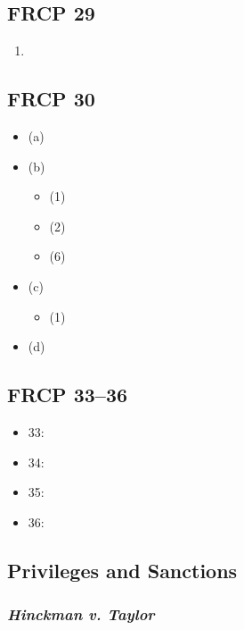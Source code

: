 \subsection{FRCP 29}

\begin{enumerate}
    \item %
\end{enumerate}

\subsection{FRCP 30}

\begin{itemize}
    \item (a) %
    \item (b) %
    \begin{itemize}
        \item (1) %
        \item (2) %
        \item (6) %
    \end{itemize}
    \item (c) %
    \begin{itemize}
        \item (1) %
    \end{itemize}
    \item (d) %
\end{itemize}

\subsection{FRCP 33--36}

\begin{itemize}
    \item 33: %
    \item 34: %
    \item 35: %
    \item 36: %
\end{itemize}

\subsection{Privileges and Sanctions}

\subsubsection{\emph{Hinckman v. Taylor}}


